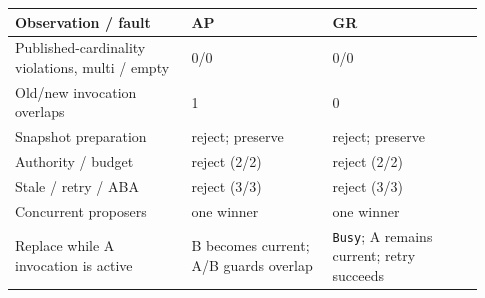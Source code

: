 \begin{tabular}{@{}p{0.35\linewidth}p{0.28\linewidth}p{0.30\linewidth}@{}}
\toprule
Observation / fault & AP & GR \\
\midrule
Published-cardinality violations, multi / empty & 0/0 & 0/0 \\
Old/new invocation overlaps & 1 & 0 \\
Snapshot preparation & reject; preserve & reject; preserve \\
Authority / budget & reject (2/2) & reject (2/2) \\
Stale / retry / ABA & reject (3/3) & reject (3/3) \\
Concurrent proposers & one winner & one winner \\
Replace while A invocation is active & B becomes current; A/B guards overlap & \texttt{Busy}; A remains current; retry succeeds \\
\bottomrule
\end{tabular}
